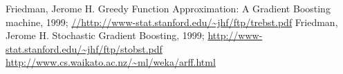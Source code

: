 \documentclass{article}
\begin{document}
\begin{thebibliography}{5}
Friedman, Jerome H.  Greedy Function Approximation: A
  Gradient Boosting machine, 1999;
  \url{//http://www-stat.stanford.edu/~jhf/ftp/trebst.pdf}
Friedman, Jerome H.  Stochastic Gradient Boosting, 1999;
  \url{http://www-stat.stanford.edu/~jhf/ftp/stobst.pdf}
 \url{http://www.cs.waikato.ac.nz/~ml/weka/arff.html}
\end{thebibliography}
\end{document}
